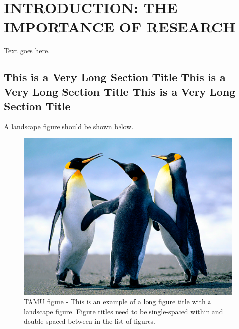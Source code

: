 %
%
%



\pagestyle{plain} %
\setcounter{page}{1}


\renewcommand*{\thefootnote}{\fnsymbol{footnote}}
\chapter[Introduction: The Importance of Research]{\uppercase {Introduction: The Importance of Research} }
\renewcommand*{\thefootnote}{\arabic{footnote}}
\setcounter{footnote}{0}


Text goes here.

\section{This is a Very Long Section Title This is a Very Long Section Title This is a Very Long Section Title }

A landscape figure should be shown below. 
\begin{figure}
\centering
\includegraphics[scale=.50]{figures/Penguins.jpg}
\caption{TAMU figure - This is an example of a long figure title with a landscape figure.  Figure titles need to be single-spaced within and double spaced between in the list of figures.}
\label{fig:tamu-fig1-1}
\end{figure}


